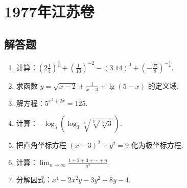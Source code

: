 \chapter{1977年江苏卷}

\section{解答题}

\begin{problem}
\begin{enumerate}
\item 计算：\( \left(2\frac{1}{4}\right)^{\frac{1}{2}}+\left(\frac{1}{10}\right)^{-2}-\left(3.14\right)^0+\left(-\frac{27}{8}\right)^{-\frac{1}{2}} \).

\item 求函数 \( y=\sqrt{x-2}+\frac{1}{x-3}+\lg\left( 5-x \right) \) 的定义域.

\item 解方程：\( 5^{x^2+2x}=125 \).

\item 计算：\( -\log_3\left( \log_3\sqrt[3]{\sqrt[3]{\sqrt[3]{3}}} \right) \).

\item 把直角坐标方程 \( \left( x-3 \right)^2+y^2=9 \) 化为极坐标方程.

\item 计算：\( \displaystyle\lim_{n\to\infty}\frac{1+2+3+\cdots+n}{n^2} \).

\item 分解因式：\( x^4-2x^2y-3y^2+8y-4 \).
\end{enumerate}
\end{problem}

